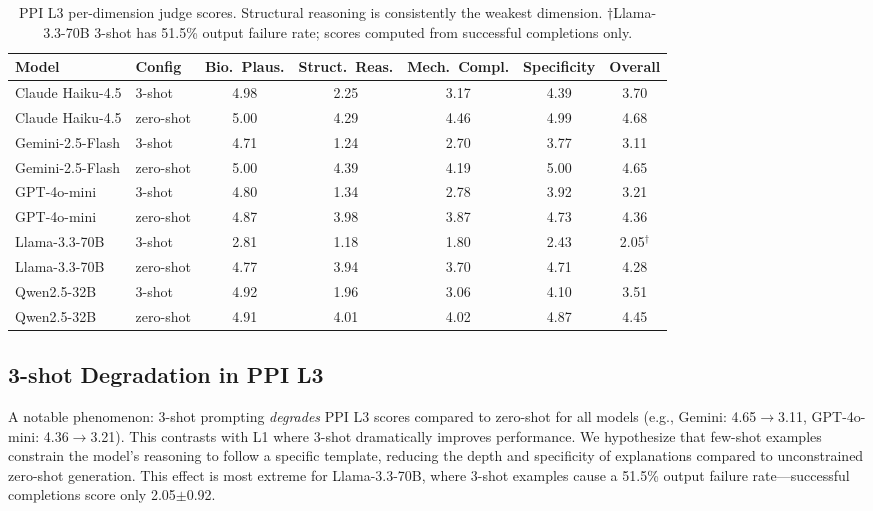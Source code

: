 \begin{table}[h]
\centering
\caption{PPI L3 per-dimension judge scores. Structural reasoning is consistently the weakest dimension. $\dagger$Llama-3.3-70B 3-shot has 51.5\% output failure rate; scores computed from successful completions only.}
\label{tab:ppi_l3_dims}
\scriptsize
\begin{tabular}{@{}llccccc@{}}
\toprule
\textbf{Model} & \textbf{Config} & \textbf{Bio.\ Plaus.} & \textbf{Struct.\ Reas.} & \textbf{Mech.\ Compl.} & \textbf{Specificity} & \textbf{Overall} \\
\midrule
Claude Haiku-4.5 & 3-shot & 4.98 & 2.25 & 3.17 & 4.39 & 3.70 \\
Claude Haiku-4.5 & zero-shot & 5.00 & 4.29 & 4.46 & 4.99 & 4.68 \\
Gemini-2.5-Flash & 3-shot & 4.71 & 1.24 & 2.70 & 3.77 & 3.11 \\
Gemini-2.5-Flash & zero-shot & 5.00 & 4.39 & 4.19 & 5.00 & 4.65 \\
GPT-4o-mini & 3-shot & 4.80 & 1.34 & 2.78 & 3.92 & 3.21 \\
GPT-4o-mini & zero-shot & 4.87 & 3.98 & 3.87 & 4.73 & 4.36 \\
Llama-3.3-70B & 3-shot & 2.81 & 1.18 & 1.80 & 2.43 & 2.05$^\dagger$ \\
Llama-3.3-70B & zero-shot & 4.77 & 3.94 & 3.70 & 4.71 & 4.28 \\
Qwen2.5-32B & 3-shot & 4.92 & 1.96 & 3.06 & 4.10 & 3.51 \\
Qwen2.5-32B & zero-shot & 4.91 & 4.01 & 4.02 & 4.87 & 4.45 \\
\bottomrule
\end{tabular}
\end{table}

\subsection{3-shot Degradation in PPI L3}

A notable phenomenon: 3-shot prompting \emph{degrades} PPI L3 scores compared to zero-shot for all models (e.g., Gemini: 4.65$\to$3.11, GPT-4o-mini: 4.36$\to$3.21). This contrasts with L1 where 3-shot dramatically improves performance. We hypothesize that few-shot examples constrain the model's reasoning to follow a specific template, reducing the depth and specificity of explanations compared to unconstrained zero-shot generation. This effect is most extreme for Llama-3.3-70B, where 3-shot examples cause a 51.5\% output failure rate---successful completions score only 2.05$\pm$0.92.

